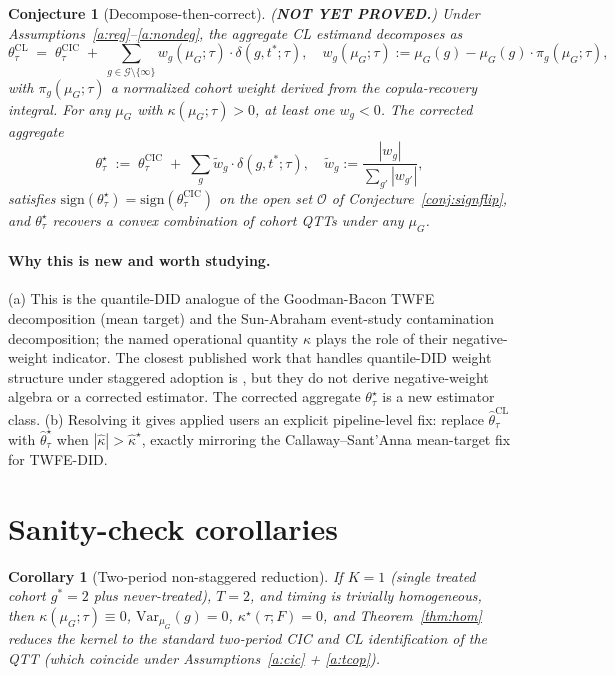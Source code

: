 \documentclass[11pt]{article}
\theoremstyle{definition}
\theoremstyle{plain}
\newtheorem{conjecture}{Conjecture}
\newtheorem{corollary}{Corollary}
\theoremstyle{remark}
\begin{document}
\begin{conjecture}[Decompose-then-correct]\label{conj:decomp}
(\textbf{NOT YET PROVED.}) Under Assumptions~\ref{a:reg}--\ref{a:nondeg}, the aggregate CL estimand decomposes as
\[
  \theta^{\mathrm{CL}}_\tau \;=\; \theta^{\mathrm{CIC}}_\tau \;+\; \sum_{g \in \mathcal{G} \setminus \{\infty\}} w_g(\mu_G;\tau) \cdot \delta(g, t^*; \tau),
  \quad w_g(\mu_G;\tau) := \mu_G(g) - \mu_G(g)\cdot \pi_g(\mu_G;\tau),
\]
with $\pi_g(\mu_G;\tau)$ a normalized cohort weight derived from the copula-recovery integral. For any $\mu_G$ with $\kappa(\mu_G;\tau) > 0$, at least one $w_g < 0$. The \emph{corrected aggregate}
\[
  \theta^{\star}_\tau \;:=\; \theta^{\mathrm{CIC}}_\tau \;+\; \sum_g \tilde w_g \cdot \delta(g, t^*; \tau), \quad \tilde w_g := \frac{|w_g|}{\sum_{g'} |w_{g'}|},
\]
satisfies $\mathrm{sign}(\theta^{\star}_\tau) = \mathrm{sign}(\theta^{\mathrm{CIC}}_\tau)$ on the open set $\mathcal{O}$ of Conjecture~\ref{conj:signflip}, and $\theta^{\star}_\tau$ recovers a convex combination of cohort QTTs under any $\mu_G$.
\end{conjecture}

\paragraph{Why this is new and worth studying.}
(a) This is the quantile-DID analogue of the Goodman-Bacon \cite{GoodmanBacon2021} TWFE decomposition (mean target) and the Sun-Abraham \cite{SunAbraham2021} event-study contamination decomposition; the named operational quantity $\kappa$ plays the role of their negative-weight indicator. The closest published work that handles quantile-DID weight structure under staggered adoption is \cite{LiLin2024}, but they do not derive negative-weight algebra or a corrected estimator. The corrected aggregate $\theta^\star_\tau$ is a new estimator class.
(b) Resolving it gives applied users an explicit pipeline-level fix: replace $\hat\theta^{\mathrm{CL}}_\tau$ with $\hat\theta^{\star}_\tau$ when $|\hat\kappa| > \hat\kappa^\star$, exactly mirroring the Callaway--Sant'Anna \cite{CallawaySantAnna2021} mean-target fix for TWFE-DID.

\section{Sanity-check corollaries}

\begin{corollary}[Two-period non-staggered reduction]\label{cor:T2}
If $K = 1$ (single treated cohort $g^* = 2$ plus never-treated), $T = 2$, and timing is trivially homogeneous, then $\kappa(\mu_G; \tau) \equiv 0$, $\mathrm{Var}_{\mu_G}(g) = 0$, $\kappa^\star(\tau; F) = 0$, and Theorem~\ref{thm:hom} reduces the kernel to the standard two-period CIC \cite{AtheyImbens2006} and CL \cite{CallawayLi2019} identification of the QTT (which coincide under Assumptions~\ref{a:cic} + \ref{a:tcop}).
\end{corollary}
\end{document}
